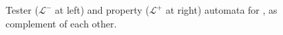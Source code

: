 \begin{figure}[H]\centering
{}
\caption{Tester ($\mathcal{L}^{-}$ at left) and property ($\mathcal{L}^{+}$ at right) automata for , as complement of each other.\label{image:tester-and-property-automata}}
\end{figure}

